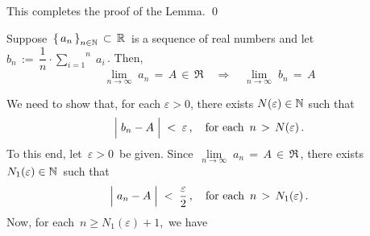 \vskip 0.5cm
\noindent
This completes the proof of the Lemma.
\qed


\vskip 1.0cm
\begin{lemma}\label{lemma:SequenceOfPartialMeans}
\mbox{}\vskip 0.1cm
\noindent
Suppose \,$\left\{\,a_{n}\,\right\}_{n\in\mathbb{N}}\,\subset\,\mathbb{R}$\, is a sequence of real numbers and let
\,$b_{n} \, := \, \dfrac{1}{n}\cdot\overset{n}{\underset{i=1}{\sum}}\;a_{i}$\,.
Then,
\begin{equation*}
\underset{n\rightarrow\infty}{\lim}\;a_{n} \,=\, A \,\in\, \Re
\quad\Longrightarrow\quad
\underset{n\rightarrow\infty}{\lim}\;b_{n} \,=\, A
\end{equation*}
\end{lemma}
\proof
We need to show that, for each $\varepsilon > 0$, there exists $N(\varepsilon) \in \mathbb{N}$ such that
\begin{equation*}
\left\vert\;b_{n} - \overset{{\color{white}.}}{A}\;\right\vert \; < \; \varepsilon\,,
\quad
\textnormal{for each \,$n \,>\, N(\varepsilon)$}\,.
\end{equation*}
To this end, let \,$\varepsilon > 0$\, be given.
Since \,$\underset{n\rightarrow\infty}{\lim}\;a_{n} \,=\, A \,\in\, \Re$\,,
there exists \,$N_{1}(\varepsilon) \in \mathbb{N}$\, such that
\begin{equation*}
\left\vert\;a_{n} - \overset{{\color{white}.}}{A}\;\right\vert \; < \; \dfrac{\varepsilon}{2}\,,
\quad
\textnormal{for each \,$n \,>\, N_{1}(\varepsilon)$}\,.
\end{equation*}
Now, for each \,$n \geq N_{1}(\varepsilon)+1$,\, we have
